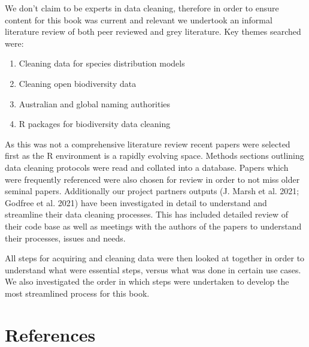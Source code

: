 \documentclass[
  letterpaper,
  DIV=11,
  numbers=noendperiod,
  oneside]{scrreprt}
\begin{document}
We don't claim to be experts in data cleaning, therefore in order to
ensure content for this book was current and relevant we undertook an
informal literature review of both peer reviewed and grey literature.
Key themes searched were:

\begin{enumerate}
\def\labelenumi{\arabic{enumi}.}
\item
  Cleaning data for species distribution models
\item
  Cleaning open biodiversity data
\item
  Australian and global naming authorities
\item
  R packages for biodiversity data cleaning
\end{enumerate}

As this was not a comprehensive literature review recent papers were
selected first as the R environment is a rapidly evolving space. Methods
sections outlining data cleaning protocols were read and collated into a
database. Papers which were frequently referenced were also chosen for
review in order to not miss older seminal papers. Additionally our
project partners outputs (J. Marsh et al. 2021; Godfree et al. 2021)
have been investigated in detail to understand and streamline their data
cleaning processes. This has included detailed review of their code base
as well as meetings with the authors of the papers to understand their
processes, issues and needs.

All steps for acquiring and cleaning data were then looked at together
in order to understand what were essential steps, versus what was done
in certain use cases. We also investigated the order in which steps were
undertaken to develop the most streamlined process for this book.


\hypertarget{sec-references}{%
\chapter{References}\label{sec-references}}
\end{document}
